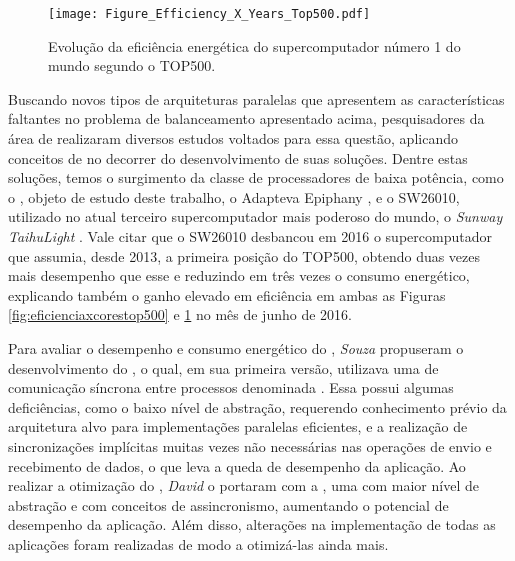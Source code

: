 \begin{figure}[tb]
  \centering
  \caption{Evolução da eficiência energética do supercomputador número 1 do mundo segundo o \ranking TOP500.}
  \label{fig:eficienciaxyearstop500}
  \texttt{[image: Figure\_Efficiency\_X\_Years\_Top500.pdf]}
\end{figure}

Buscando novos tipos de arquiteturas paralelas que apresentem as características faltantes no problema de balanceamento apresentado acima, pesquisadores da área de \HPC realizaram diversos estudos voltados para essa questão, aplicando conceitos de \greencomputing \cite{greencomputingacm} no decorrer do desenvolvimento de suas soluções. Dentre estas soluções, temos o surgimento da classe de processadores \manycore de baixa potência, como o \mppa \cite{mppa2562013}, objeto de estudo deste trabalho, o Adapteva Epiphany \cite{olofsson2014}, e o SW26010, utilizado no atual terceiro supercomputador mais poderoso do mundo, o \textit{Sunway TaihuLight} \cite{fu2016sunway}. Vale citar que o SW26010 desbancou em 2016 o supercomputador que assumia, desde 2013, a primeira posição do \ranking TOP500, obtendo duas vezes mais desempenho que esse e reduzindo em três vezes o consumo energético, explicando também o ganho elevado em eficiência em ambas as Figuras \ref{fig:eficienciaxcorestop500} e \ref{fig:eficienciaxyearstop500} no mês de junho de 2016.

Para avaliar o desempenho e consumo energético do \mppa, \textit{Souza} \etal propuseram o desenvolvimento do \bench \capb, o qual, em sua primeira versão, utilizava uma \API de comunicação síncrona entre processos denominada \IPC \cite{mppa2562013}. Essa \API possui algumas deficiências, como o baixo nível de abstração, requerendo conhecimento prévio da arquitetura alvo para implementações paralelas eficientes, e a realização de sincronizações implícitas muitas vezes não necessárias nas operações de envio e recebimento de dados, o que leva a queda de desempenho da aplicação. Ao realizar a otimização do \bench, \textit{David} \etal o portaram com a \ASYNC, uma \API com maior nível de abstração e com conceitos de assincronismo, aumentando o potencial de desempenho da aplicação. Além disso, alterações na implementação de todas as aplicações foram realizadas de modo a otimizá-las ainda mais.

